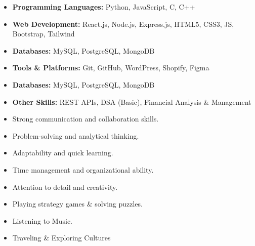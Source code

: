 \documentclass[10pt,a4paper,ragged2e]{altacv}
\begin{document}
\smallskip
\begin{itemize}
\item \textbf{Programming Languages: }Python, JavaScript, C, C++
\smallskip
\item \textbf{Web Development: }React.js, Node.js, Express.js, HTML5, CSS3, JS, Bootstrap, Tailwind
\smallskip
\item \textbf{Databases: }MySQL, PostgreSQL, MongoDB
\smallskip
\item  \textbf{Tools \& Platforms:} Git, GitHub, WordPress, Shopify, Figma 
\smallskip
\item \textbf{Databases: }MySQL, PostgreSQL, MongoDB
\smallskip
\item \textbf{Other Skills:} REST APIs, DSA (Basic), Financial Analysis \& Management 
\smallskip


\end{itemize}
\smallskip
\begin{itemize}
\item Strong communication and collaboration skills.
\smallskip
\item Problem-solving and analytical thinking.
\smallskip
\item Adaptability and quick learning.
\smallskip
\item Time management and organizational ability.
\smallskip
\item Attention to detail and creativity.
\smallskip
\end{itemize}

\smallskip
\begin{itemize}
\item Playing strategy games \& solving puzzles.
\smallskip
\item Listening to Music.
\smallskip
\item Traveling \& Exploring Cultures
\end{itemize}

\clearpage
\end{document}
